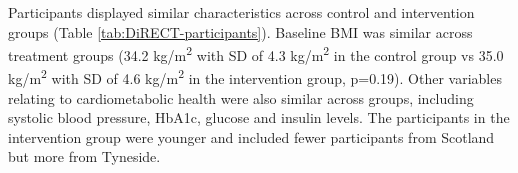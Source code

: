 \documentclass[11pt,twoside]{bristolthesis}
\begin{document}
Participants displayed similar characteristics across control and intervention groups (Table \ref{tab:DiRECT-participants}). Baseline BMI was similar across treatment groups (34.2 kg/m\textsuperscript{2} with SD of 4.3 kg/m\textsuperscript{2} in the control group vs 35.0 kg/m\textsuperscript{2} with SD of 4.6 kg/m\textsuperscript{2} in the intervention group, p=0.19). Other variables relating to cardiometabolic health were also similar across groups, including systolic blood pressure, HbA1c, glucose and insulin levels. The participants in the intervention group were younger and included fewer participants from Scotland but more from Tyneside.



\begin{landscape}\begin{table}


\end{table}
\end{landscape}
\end{document}
